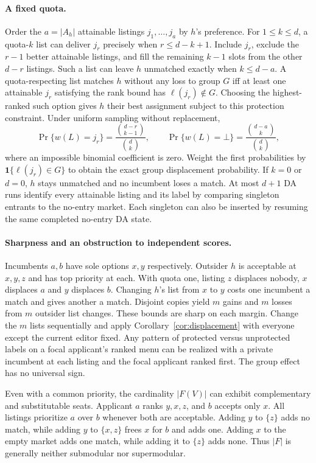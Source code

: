 \paragraph{A fixed quota.}
Order the $a=|A_h|$ attainable listings $j_1,\ldots,j_a$ by $h$'s preference. For $1\le k\le d$, a quota-$k$ list can deliver $j_r$ precisely when $r\le d-k+1$. Include $j_r$, exclude the $r-1$ better attainable listings, and fill the remaining $k-1$ slots from the other $d-r$ listings. Such a list can leave $h$ unmatched exactly when $k\le d-a$. A quota-respecting list matches $h$ without any loss to group $G$ iff at least one attainable $j_r$ satisfying the rank bound has $\ell(j_r)\notin G$. Choosing the highest-ranked such option gives $h$ their best assignment subject to this protection constraint. Under uniform sampling without replacement,
\[
  \Pr\{w(L)=j_r\}=\frac{\binom{d-r}{k-1}}{\binom{d}{k}},
  \qquad
  \Pr\{w(L)=\bot\}=\frac{\binom{d-a}{k}}{\binom{d}{k}},
\]
where an impossible binomial coefficient is zero. Weight the first probabilities by $\mathbf1\{\ell(j_r)\in G\}$ to obtain the exact group displacement probability. If $k=0$ or $d=0$, $h$ stays unmatched and no incumbent loses a match. At most $d+1$ DA runs identify every attainable listing and its label by comparing singleton entrants to the no-entry market. Each singleton can also be inserted by resuming the same completed no-entry DA state.

\paragraph{Sharpness and an obstruction to independent scores.}
Incumbents $a,b$ have sole options $x,y$ respectively. Outsider $h$ is acceptable at $x,y,z$ and has top priority at each. With quota one, listing $z$ displaces nobody, $x$ displaces $a$ and $y$ displaces $b$. Changing $h$'s list from $x$ to $y$ costs one incumbent a match and gives another a match. Disjoint copies yield $m$ gains and $m$ losses from $m$ outsider list changes. These bounds are sharp on each margin. Change the $m$ lists sequentially and apply Corollary~\ref{cor:displacement} with everyone except the current editor fixed. Any pattern of protected versus unprotected labels on a focal applicant's ranked menu can be realized with a private incumbent at each listing and the focal applicant ranked first. The group effect has no universal sign.

Even with a common priority, the cardinality $|F(V)|$ can exhibit complementary and substitutable seats. Applicant $a$ ranks $y,x,z$, and $b$ accepts only $x$. All listings prioritize $a$ over $b$ whenever both are acceptable. Adding $y$ to $\{z\}$ adds no match, while adding $y$ to $\{x,z\}$ frees $x$ for $b$ and adds one. Adding $x$ to the empty market adds one match, while adding it to $\{z\}$ adds none. Thus $|F|$ is generally neither submodular nor supermodular.

